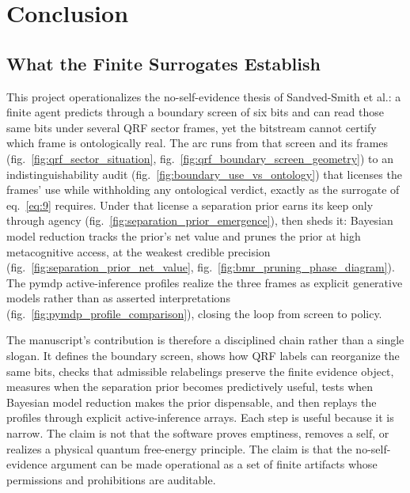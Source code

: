\documentclass[
]{article}
\begin{document}
\newpage

\section{Conclusion}\label{sec:conclusion}

\subsection{What the Finite Surrogates
Establish}\label{sec:conclusion-finite-surrogates-establish}

This project operationalizes the no-self-evidence thesis of
Sandved-Smith et al.: a finite agent predicts through a boundary screen
of six bits and can read those same bits under several QRF sector
frames, yet the bitstream cannot certify which frame is ontologically
real. The arc runs from that screen and its frames
(fig.~\ref{fig:qrf_sector_situation},
fig.~\ref{fig:qrf_boundary_screen_geometry}) to an indistinguishability
audit (fig.~\ref{fig:boundary_use_vs_ontology}) that licenses the
frames' use while withholding any ontological verdict, exactly as the
surrogate of eq.~\ref{eq:9} requires. Under that license a separation
prior earns its keep only through agency
(fig.~\ref{fig:separation_prior_emergence}), then sheds it: Bayesian
model reduction tracks the prior's net value and prunes the prior at
high metacognitive access, at the weakest credible precision
(fig.~\ref{fig:separation_prior_net_value},
fig.~\ref{fig:bmr_pruning_phase_diagram}). The pymdp active-inference
profiles realize the three frames as explicit generative models rather
than as asserted interpretations
(fig.~\ref{fig:pymdp_profile_comparison}), closing the loop from screen
to policy.

The manuscript's contribution is therefore a disciplined chain rather
than a single slogan. It defines the boundary screen, shows how QRF
labels can reorganize the same bits, checks that admissible relabelings
preserve the finite evidence object, measures when the separation prior
becomes predictively useful, tests when Bayesian model reduction makes
the prior dispensable, and then replays the profiles through explicit
active-inference arrays. Each step is useful because it is narrow. The
claim is not that the software proves emptiness, removes a self, or
realizes a physical quantum free-energy principle. The claim is that the
no-self-evidence argument can be made operational as a set of finite
artifacts whose permissions and prohibitions are auditable.
\end{document}
